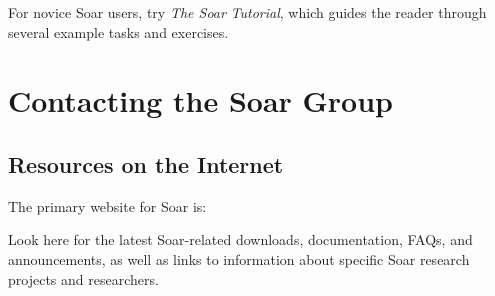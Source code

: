 For novice Soar users, try \textit{The Soar} \textit{\SoarVersionMajor} \textit{Tutorial}, which guides the reader
through several example tasks and exercises.


%
%
\section{Contacting the Soar Group}
\label{CONTACT}

\subsection*{Resources on the Internet}

The primary website for Soar is:

\hspace{2em}

Look here for the latest Soar-related downloads, documentation, FAQs, and announcements, as well
as links to information about specific Soar research projects and researchers.

